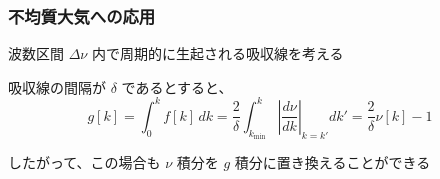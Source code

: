 \documentclass[unicode,colorlinks]{beamer}
\begin{document}
\begin{frame}
	\frametitle{不均質大気への応用}
	波数区間 $\Delta\nu$ 内で周期的に生起される吸収線を考える

	吸収線の間隔が $\delta$ であるとすると、
	\[
		g[k]=\int^k_0 f[k]\,dk
		=\frac{2}{\delta}\int^k_{k_{\mathrm{min}}}\left|\frac{d\nu}{dk}\right|_{k=k'}dk'
		=\frac{2}{\delta}\nu[k]-1
	\]

	したがって、この場合も $\nu$ 積分を $g$ 積分に置き換えることができる
\end{frame}
\end{document}
